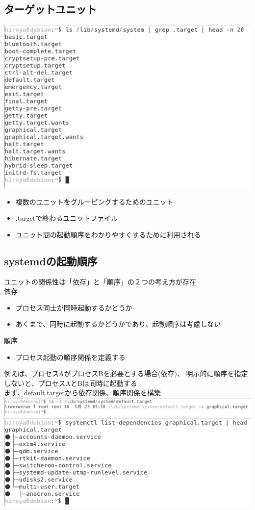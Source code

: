 \documentclass[mingoth,a4paper]{jsarticle}
\begin{document}
\subsection{ターゲットユニット}
\includegraphics[keepaspectratio,width=0.5\hsize]{image201905-kansai/targetunit01_gray.png}
\begin{itemize}
 \item 複数のユニットをグルーピングするためのユニット
 \item .targetで終わるユニットファイル
 \item ユニット間の起動順序をわかりやすくするために利用される
\end{itemize}

\subsection{systemdの起動順序}
ユニットの関係性は「依存」と「順序」の２つの考え方が存在\\
依存
\begin{itemize}
 \item プロセス同士が同時起動するかどうか
 \item あくまで、同時に起動するかどうかであり、起動順序は考慮しない
\end{itemize}

順序
\begin{itemize}
 \item プロセス起動の順序関係を定義する
\end{itemize}

例えば、プロセスAがプロセスBを必要とする場合(依存)、
明示的に順序を指定しないと、プロセスAとBは同時に起動する\\

まず、default.targetから依存関係、順序関係を構築
 \\
\includegraphics[keepaspectratio,width=0.7\hsize]{image201905-kansai/order01_gray.png}
 \\
\includegraphics[keepaspectratio,width=0.7\hsize]{image201905-kansai/order02_gray.png}
\end{document}
